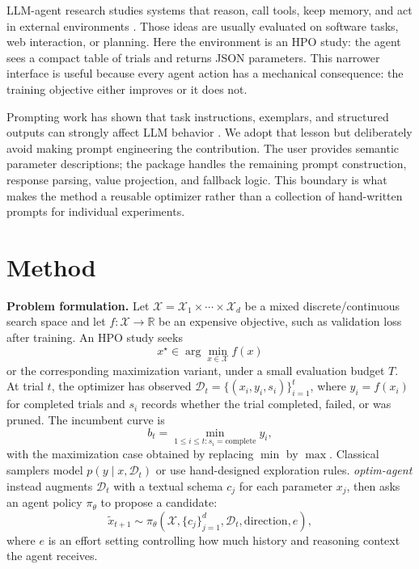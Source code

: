 \documentclass[letterpaper]{article}
\begin{document}
LLM-agent research studies systems that reason, call tools, keep memory, and
act in external environments
\cite{yao2023react,schick2023toolformer,shinn2023reflexion,wang2024surveyagents}.
Those ideas are usually evaluated on software tasks, web interaction, or
planning. Here the environment is an HPO study: the agent sees a compact table
of trials and returns JSON parameters. This narrower interface is useful because
every agent action has a mechanical consequence: the training objective either
improves or it does not.

Prompting work has shown that task instructions, exemplars, and structured
outputs can strongly affect LLM behavior
\cite{wei2022cot,kojima2022zeroshot,liu2023surveyprompt}. We adopt that lesson
but deliberately avoid making prompt engineering the contribution. The user
provides semantic parameter descriptions; the package handles the remaining
prompt construction, response parsing, value projection, and fallback logic.
This boundary is what makes the method a reusable optimizer rather than a
collection of hand-written prompts for individual experiments.

\section{Method}

\textbf{Problem formulation.} Let $\mathcal{X}=\mathcal{X}_1\times\cdots
\times\mathcal{X}_d$ be a mixed discrete/continuous search space and let
$f:\mathcal{X}\rightarrow\mathbb{R}$ be an expensive objective, such as
validation loss after training. An HPO study seeks
\begin{equation}
  x^\star \in \arg\min_{x\in\mathcal{X}} f(x)
\end{equation}
or the corresponding maximization variant, under a small evaluation budget
$T$. At trial $t$, the optimizer has observed
$\mathcal{D}_t=\{(x_i,y_i,s_i)\}_{i=1}^{t}$, where $y_i=f(x_i)$ for completed
trials and $s_i$ records whether the trial completed, failed, or was pruned.
The incumbent curve is
\begin{equation}
  b_t=\min_{1\le i\le t:s_i=\mathrm{complete}} y_i ,
\end{equation}
with the maximization case obtained by replacing $\min$ by $\max$. Classical
samplers model $p(y\mid x,\mathcal{D}_t)$ or use hand-designed exploration
rules. \emph{optim-agent} instead augments $\mathcal{D}_t$ with a textual schema
$c_j$ for each parameter $x_j$, then asks an agent policy $\pi_\theta$ to propose
a candidate:
\begin{equation}
  \tilde{x}_{t+1} \sim \pi_\theta(\mathcal{X}, \{c_j\}_{j=1}^{d},
  \mathcal{D}_t, \mathrm{direction}, e),
\end{equation}
where $e$ is an effort setting controlling how much history and reasoning
context the agent receives.
\end{document}
